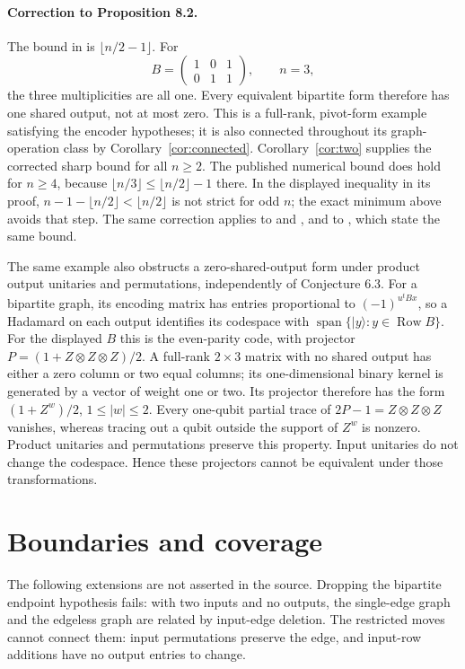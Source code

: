 \documentclass[11pt]{article}
\newcommand{\Row}{\operatorname{Row}}
\begin{document}
\paragraph{Correction to Proposition 8.2.}
The bound in \cite[Proposition 8.2, p.~23]{KL} is
$\lfloor n/2-1\rfloor$. For
\[
 B=\begin{pmatrix}1&0&1\\0&1&1\end{pmatrix},
 \qquad n=3,
\]
the three multiplicities are all one. Every equivalent bipartite form
therefore has one shared output, not at most zero. This is a full-rank,
pivot-form example satisfying the encoder hypotheses; it is also connected
throughout its graph-operation class by Corollary~\ref{cor:connected}.
Corollary~\ref{cor:two} supplies the corrected sharp bound for all $n\geq2$.
The published numerical bound does hold for $n\geq4$, because
$\lfloor n/3\rfloor\leq\lfloor n/2\rfloor-1$ there. In the displayed
inequality in its proof, $n-1-\lfloor n/2\rfloor<\lfloor n/2\rfloor$
is not strict for odd $n$; the exact minimum above avoids that step.
The same correction applies to \cite[Claim 7.2, p.~14]{KL0} and
\cite[Proposition 5.8.2, pp.~127--128]{Khesin}, and to
\cite[Claim G, pp.~18--20]{Li}, which state the same bound.

The same example also obstructs a zero-shared-output form under product
output unitaries and permutations, independently of Conjecture 6.3.
For a bipartite graph, its encoding matrix has entries proportional to
$(-1)^{u^tBx}$, so a Hadamard on each output identifies its codespace with
$\operatorname{span}\{|y\rangle:y\in\Row B\}$.
For the displayed $B$ this is the even-parity code, with projector
$P=(1+Z\otimes Z\otimes Z)/2$. A full-rank $2\times3$ matrix with no
shared output has either a zero column or two equal columns; its
one-dimensional binary kernel is generated by a vector of weight one or
two. Its projector therefore has the form $(1+Z^w)/2$, $1\leq|w|\leq2$.
Every one-qubit partial trace of $2P-1=Z\otimes Z\otimes Z$ vanishes,
whereas tracing out a qubit outside the support of $Z^w$ is nonzero.
Product unitaries and permutations preserve this property. Input
unitaries do not change the codespace. Hence these projectors cannot be
equivalent under those transformations.

\section{Boundaries and coverage}
The following extensions are not asserted in the source. Dropping the
bipartite endpoint hypothesis fails: with two inputs and no outputs, the
single-edge graph and the edgeless graph are related by input-edge
deletion. The restricted moves cannot connect them: input permutations
preserve the edge, and input-row additions have no output entries to change.
\end{document}
